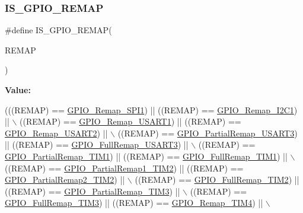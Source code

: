 \subsubsection{\texorpdfstring{I\+S\+\_\+\+G\+P\+I\+O\+\_\+\+R\+E\+M\+AP}{IS\_GPIO\_REMAP}}
{\footnotesize\ttfamily \#define I\+S\+\_\+\+G\+P\+I\+O\+\_\+\+R\+E\+M\+AP(\begin{DoxyParamCaption}\item[{}]{R\+E\+M\+AP }\end{DoxyParamCaption})}

{\bfseries Value\+:}
\begin{DoxyCode}
(((REMAP) == \hyperlink{group___g_p_i_o___remap__define_ga58b02a04a6041954c6e99e681716ab4c}{GPIO\_Remap\_SPI1}) || ((REMAP) == \hyperlink{group___g_p_i_o___remap__define_ga6cf601e6db62cb2e9dbbccb276401b18}{GPIO\_Remap\_I2C1}) || \(\backslash\)
                              ((REMAP) == \hyperlink{group___g_p_i_o___remap__define_ga804d946c5ca246a1f02f73a086586fd6}{GPIO\_Remap\_USART1}) || ((REMAP) == 
      \hyperlink{group___g_p_i_o___remap__define_gaeb2ebb12e23138509af20dce1fc6c246}{GPIO\_Remap\_USART2}) || \(\backslash\)
                              ((REMAP) == \hyperlink{group___g_p_i_o___remap__define_ga97af4aa8dded530353160cca615ad201}{GPIO\_PartialRemap\_USART3}) || ((REMAP) == 
      \hyperlink{group___g_p_i_o___remap__define_gaa8831190b5b68e9f871955b791fa358b}{GPIO\_FullRemap\_USART3}) || \(\backslash\)
                              ((REMAP) == \hyperlink{group___g_p_i_o___remap__define_ga0e94344776c53a76f6e9d933139c05a6}{GPIO\_PartialRemap\_TIM1}) || ((REMAP) == 
      \hyperlink{group___g_p_i_o___remap__define_gaf1f2d5cbc2281b3e3a6cc51c3fe7f77f}{GPIO\_FullRemap\_TIM1}) || \(\backslash\)
                              ((REMAP) == \hyperlink{group___g_p_i_o___remap__define_ga7ad69d3e2643b2bfee4eebbea4a5b80e}{GPIO\_PartialRemap1\_TIM2}) || ((REMAP) == 
      \hyperlink{group___g_p_i_o___remap__define_ga42908e73dfc201d0a7b4ab0ed6f15eb7}{GPIO\_PartialRemap2\_TIM2}) || \(\backslash\)
                              ((REMAP) == \hyperlink{group___g_p_i_o___remap__define_ga2bd999e77236155935d2a598d4bac2a9}{GPIO\_FullRemap\_TIM2}) || ((REMAP) == 
      \hyperlink{group___g_p_i_o___remap__define_gaaced3961a038fd8b41abfaf55d24f609}{GPIO\_PartialRemap\_TIM3}) || \(\backslash\)
                              ((REMAP) == \hyperlink{group___g_p_i_o___remap__define_ga8ba8cef32c5076db1872e173f873dae6}{GPIO\_FullRemap\_TIM3}) || ((REMAP) == 
      \hyperlink{group___g_p_i_o___remap__define_ga041b2f02b32895ce34bcd7499c9e873f}{GPIO\_Remap\_TIM4}) || \(\backslash\)

\end{DoxyCode}

